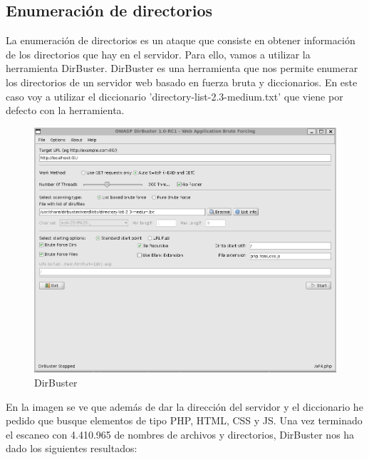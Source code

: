\documentclass{report}
\begin{document}
            \subsection{Enumeración de directorios}
                La enumeración de directorios es un ataque que consiste en obtener información de los directorios que hay en el servidor.
                Para ello, vamos a utilizar la herramienta DirBuster.
                DirBuster es una herramienta que nos permite enumerar los directorios de un servidor web basado en fuerza bruta y diccionarios.
                En este caso voy a utilizar el diccionario 'directory-list-2.3-medium.txt' que viene por defecto con la herramienta.
                \begin{figure}[H]
                    \centering
                    \includegraphics[width=1\textwidth]{./img/vulnerabilidades/2.4/2.1.png}
                    \caption{DirBuster}
                \end{figure}
                En la imagen se ve que además de dar la dirección del servidor y el diccionario he pedido que busque elementos de tipo PHP, HTML, CSS y JS.
                \clearpage
                Una vez terminado el escaneo con 4.410.965 de nombres de archivos y directorios, DirBuster nos ha dado los siguientes resultados:
\end{document}

